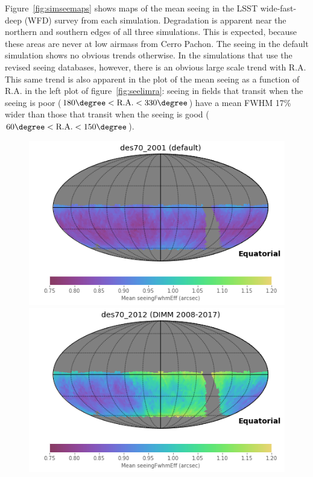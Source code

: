 \documentclass[\docopts]{\docclass}
\begin{document}
Figure~\ref{fig:simseemaps} shows maps of the mean seeing in the LSST
wide-fast-deep (WFD) survey from each simulation. Degradation is
apparent near the northern and southern edges of all three
simulations. This is expected, because these areas are never at low
airmass from Cerro Pachon. The seeing in the default simulation
shows no obvious trends otherwise. In the simulations that use the
revised seeing databases, however, there is an obvious large scale
trend with R.A. This same trend is also apparent in the plot of the
mean seeing as a function of R.A. in the left plot of
figure~\ref{fig:seelimra}: seeing in fields that transit when the
seeing is poor ($180\degree < \mbox{R.A.} < 330\degree$) have a mean
FWHM 17\% wider than those that transit when the seeing is good
($60\degree < \mbox{R.A.} < 150\degree$).

\begin{figure}
  \includegraphics[width=\columnwidth]{seeing_map_2001.png}
\endminipage\hfill
{}
  \includegraphics[width=\columnwidth]{seeing_map_2012.png}

\end{figure}
\end{document}
